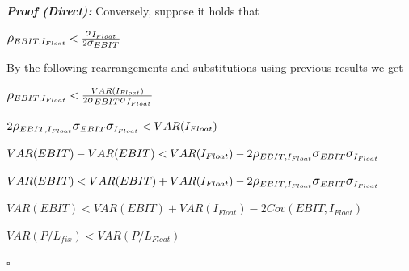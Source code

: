 \documentclass[12pt, a4paper]{article}
\begin{document}
\textbf{\textit{Proof (Direct):}} Conversely, suppose it holds that 

\begin{center}
$\mathlarger{\mathlarger{\rho}}_{EBIT, I_{Float}} < \frac{\mathlarger{\mathlarger{\sigma}}_{I_{Float}}}{2\mathlarger{\mathlarger{\sigma}}_{EBIT}}$
\end{center}

By the following rearrangements and substitutions using previous results we get

\begin{center}

$\mathlarger{\mathlarger{\rho}}_{EBIT, I_{Float}} < \frac{VAR(I_{Float})}{2\mathlarger{\mathlarger{\sigma}}_{EBIT} \mathlarger{\mathlarger{\sigma}}_{I_{Float}}}$
\bigskip

$2\mathlarger{\mathlarger{\rho}}_{EBIT, I_{Float}}\mathlarger{\mathlarger{\sigma}}_{EBIT} \mathlarger{\mathlarger{\sigma}}_{I_{Float}} < VAR(I_{Float})$
\bigskip

$VAR(EBIT) - VAR(EBIT) < VAR(I_{Float})- 2\mathlarger{\mathlarger{\rho}}_{EBIT, I_{Float}}\mathlarger{\mathlarger{\sigma}}_{EBIT} \mathlarger{\mathlarger{\sigma}}_{I_{Float}}$
\bigskip

$VAR(EBIT) < VAR(EBIT) + VAR(I_{Float}) - 2\mathlarger{\mathlarger{\rho}}_{EBIT, I_{Float}} \mathlarger{\mathlarger{\sigma}}_{EBIT} \mathlarger{\mathlarger{\sigma}}_{I_{Float}}$
\bigskip

$VAR(EBIT) < VAR(EBIT) + VAR(I_{Float}) - 2Cov(EBIT,I_{Float})$
\bigskip

$VAR(P/L_{fix}) < VAR(P/L_{Float})$
\bigskip

\end{center}

\hfill $\square$
\end{document}
